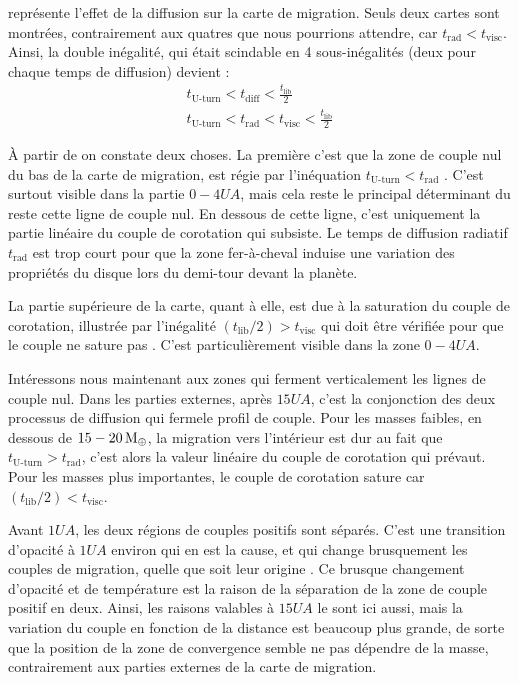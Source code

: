  représente l'effet de la diffusion sur la carte de migration. Seuls deux cartes sont montrées, contrairement aux quatres que nous pourrions attendre, car $t_\text{rad}<t_\text{visc}$. Ainsi, la double inégalité, qui était scindable en 4 sous-inégalités (deux pour chaque temps de diffusion) devient :
\begin{align}
t_\text{U-turn} < t_\text{diff} < \frac{t_\text{lib}}{2}\\
t_\text{U-turn} < t_\text{rad} < t_\text{visc} < \frac{t_\text{lib}}{2}
\end{align}

À partir de  on constate deux choses. La première c'est que la zone de couple nul du bas de la carte de migration, est régie par l'inéquation $t_\text{U-turn} < t_\text{rad}$ . C'est surtout visible dans la partie $0-4\unit{UA}$, mais cela reste le principal déterminant du reste cette ligne de couple nul. En dessous de cette ligne, c'est uniquement la partie linéaire du couple de corotation qui subsiste. Le temps de diffusion radiatif $t_\text{rad}$ est trop court pour que la zone fer-à-cheval induise une variation des propriétés du disque lors du demi-tour devant la planète. 

La partie supérieure de la carte, quant à elle, est due à la saturation du couple de corotation, illustrée par l'inégalité $(t_\text{lib}/2) > t_\text{visc}$ qui doit être vérifiée pour que le couple ne sature pas . C'est particulièrement visible dans la zone $0-4\unit{UA}$. 

Intéressons nous maintenant aux zones qui ferment verticalement les lignes de couple nul. Dans les parties externes, après $15\unit{UA}$, c'est la conjonction des deux processus de diffusion qui \og ferme\fg le profil de couple. Pour les masses faibles, en dessous de $15-20\mathrm{\thinspace M_\oplus}$, la migration vers l'intérieur est dur au fait que $t_\text{U-turn} > t_\text{rad}$, c'est alors la valeur linéaire du couple de corotation qui prévaut. Pour les masses plus importantes, le couple de corotation sature car $(t_\text{lib}/2) < t_\text{visc}$. 

Avant $1\unit{UA}$, les deux régions de couples positifs sont séparés. C'est une transition d'opacité à $1\unit{UA}$ environ qui en est la cause, et qui change brusquement les couples de migration, quelle que soit leur origine . Ce brusque changement d'opacité et de température est la raison de la séparation de la zone de couple positif en deux. Ainsi, les raisons valables à $15\unit{UA}$ le sont ici aussi, mais la variation du couple en fonction de la distance est beaucoup plus grande, de sorte que la position de la zone de convergence semble ne pas dépendre de la masse, contrairement aux parties externes de la carte de migration.

